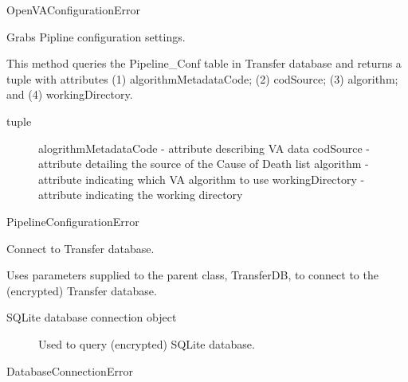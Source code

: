 \documentclass[letterpaper,12pt,english]{sphinxmanual}
\begin{document}
\begin{fulllineitems}
\begin{fulllineitems}
\begin{description}
\end{description}

OpenVAConfigurationError

\end{fulllineitems}


\begin{fulllineitems}
\label{\detokenize{help:transferDB.TransferDB.configPipeline}}
Grabs Pipline configuration settings.

This method queries the Pipeline\_Conf table in Transfer database and
returns a tuple with attributes (1) algorithmMetadataCode; (2)
codSource; (3) algorithm; and (4) workingDirectory.
\begin{description}
\item[{tuple}] \leavevmode
alogrithmMetadataCode - attribute describing VA data
codSource - attribute detailing the source of the Cause of Death list
algorithm - attribute indicating which VA algorithm to use
workingDirectory - attribute indicating the working directory

\end{description}

PipelineConfigurationError

\end{fulllineitems}


\begin{fulllineitems}
\label{\detokenize{help:transferDB.TransferDB.connectDB}}
Connect to Transfer database.

Uses parameters supplied to the parent class, TransferDB, to connect to
the (encrypted) Transfer database.
\begin{description}
\item[{SQLite database connection object}] \leavevmode
Used to query (encrypted) SQLite database.

\end{description}

DatabaseConnectionError

\end{fulllineitems}



\end{fulllineitems}
\end{document}
